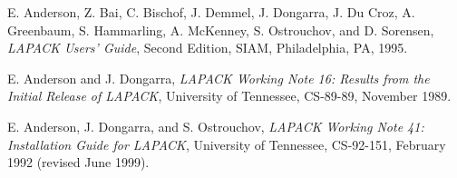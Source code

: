%
%


\newpage
{}

E. Anderson, Z. Bai, C. Bischof, J. Demmel, J. Dongarra,
J. Du Croz, A. Greenbaum, S. Hammarling, A. McKenney,
S. Ostrouchov, and D. Sorensen, 
{\em LAPACK Users' Guide}, Second Edition,
{SIAM}, Philadelphia, PA, 1995.

E. Anderson and J. Dongarra,
{\em LAPACK Working Note 16: 
Results from the Initial Release of LAPACK},
University of Tennessee, CS-89-89, November 1989.

E. Anderson, J. Dongarra, and S. Ostrouchov,
{\em LAPACK Working Note 41: 
Installation Guide for LAPACK},
University of Tennessee, CS-92-151, February 1992 (revised June 1999).

